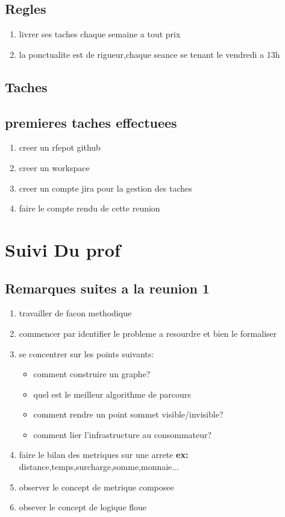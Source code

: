 \documentclass{article}
\begin{document}
\subsection{Regles}
   \begin{enumerate}
      \item livrer ses taches chaque semaine a tout prix
        \item  la ponctualite est de rigueur,chaque seance se tenant le vendredi a 13h
  
   \end{enumerate}
   
 
\subsection{Taches}

\subsection{premieres taches effectuees}
\begin{enumerate}
    \item creer un rfepot github
      \item  creer un workspace
        \item  creer un compte jira pour la gestion des taches
          \item  faire le compte rendu de cette reunion
\end{enumerate}
\section{Suivi Du prof}

\subsection{Remarques suites a la reunion 1}
\begin{enumerate}
\item  travailler de facon methodique
    
\item commencer par identifier le probleme a resourdre et bien le formaliser
\item  se concentrer sur les points suivants:
        \begin{itemize}
            \item comment construire un graphe?
            \item  quel est le meilleur algorithme de parcours
            \item  comment rendre un point sommet visible/invisible?
            \item  comment lier l'infrastructure au consommateur?
        \end{itemize}
\item faire le bilan des metriques sur une arrete \textbf{ex:} distance,temps,surcharge,somme,monnaie...
\item observer le concept de metrique composee
\item obsever le concept de logique floue

\end{enumerate}
\end{document}
